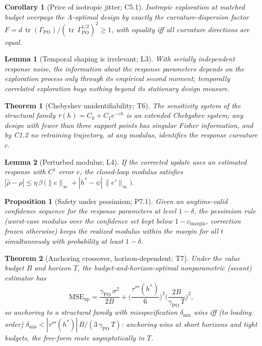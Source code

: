 \documentclass[11pt]{article}
\newtheorem{theorem}{Theorem}
\newtheorem{lemma}{Lemma}
\newtheorem{corollary}{Corollary}
\newtheorem{proposition}{Proposition}
\newcommand{\gpo}{\gamma_{\mathrm{PO}}}
\newcommand{\Gpo}{\Gamma_{\mathrm{PO}}}
\newcommand{\hstar}{h^{*}}
\newcommand{\tr}{\operatorname{tr}}
\begin{document}
\begin{corollary}[Price of isotropic jitter; C5.1]
Isotropic exploration at matched budget overpays the A-optimal design by
exactly the curvature-dispersion factor
$F = d\,\tr(\Gpo)/(\tr\,\Gpo^{1/2})^2 \ge 1$, with equality iff all
curvature directions are equal.
\end{corollary}

\begin{lemma}[Temporal shaping is irrelevant; L3]
With serially independent response noise, the information about the
response parameters depends on the exploration process only through its
empirical second moment; temporally correlated exploration buys nothing
beyond its stationary design measure.
\end{lemma}

\begin{theorem}[Chebyshev unidentifiability; T6]
The sensitivity system of the structural family
$\tau(h) = C_0 + C_1 e^{-ch}$ is an extended Chebyshev system; any design
with fewer than three support points has singular Fisher information, and
by C1.2 no retraining trajectory, at any modulus, identifies the response
curvature $c$.
\end{theorem}

\begin{lemma}[Perturbed modulus; L4]
If the corrected update uses an estimated response with $C^1$ error $e$,
the closed-loop modulus satisfies
$|\hat\rho - \rho| \le \eta\,\beta\,\big(\|e\|_\infty +
|\hstar-\psi|\,\|e'\|_\infty\big)$.
\end{lemma}

\begin{proposition}[Safety under pessimism; P7.1]
Given an anytime-valid confidence sequence for the response parameters at
level $1-\delta$, the pessimism rule (worst-case modulus over the
confidence set kept below $1 - c_{\mathrm{margin}}$, correction frozen
otherwise) keeps the realized modulus within the margin for all $t$
simultaneously with probability at least $1-\delta$.
\end{proposition}

\begin{theorem}[Anchoring crossover, horizon-dependent; T7]
Under the value budget $B$ and horizon $T$, the budget-and-horizon-optimal
nonparametric (secant) estimator has
\[
\mathrm{MSE}_{\mathrm{np}} = \frac{\gpo\,\sigma^2}{2B}
+ \Big(\frac{\tau'''(\hstar)}{6}\Big)^{\!2}
\Big(\frac{2B}{\gpo\,T}\Big)^{\!2},
\]
so anchoring to a structural family with misspecification
$\delta_{\mathrm{mis}}$ wins iff (to leading order)
$\delta_{\mathrm{mis}} < |\tau'''(\hstar)|\,B/(3\,\gpo\,T)$: anchoring wins
at short horizons and tight budgets, the free-form route asymptotically in
$T$.
\end{theorem}
\end{document}
